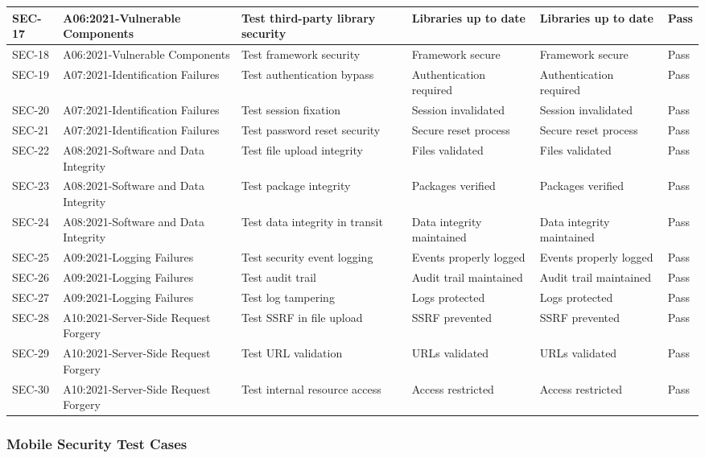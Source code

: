 {\begin{longtable}{|p{1.5cm}|p{2.5cm}|p{3.5cm}|p{2.5cm}|p{2.5cm}|p{1.5cm}|}
\hline
SEC-17 & A06:2021-Vulnerable Components & Test third-party library security & Libraries up to date & Libraries up to date & Pass \\
\hline
SEC-18 & A06:2021-Vulnerable Components & Test framework security & Framework secure & Framework secure & Pass \\
\hline
SEC-19 & A07:2021-Identification Failures & Test authentication bypass & Authentication required & Authentication required & Pass \\
\hline
SEC-20 & A07:2021-Identification Failures & Test session fixation & Session invalidated & Session invalidated & Pass \\
\hline
SEC-21 & A07:2021-Identification Failures & Test password reset security & Secure reset process & Secure reset process & Pass \\
\hline
SEC-22 & A08:2021-Software and Data Integrity & Test file upload integrity & Files validated & Files validated & Pass \\
\hline
SEC-23 & A08:2021-Software and Data Integrity & Test package integrity & Packages verified & Packages verified & Pass \\
\hline
SEC-24 & A08:2021-Software and Data Integrity & Test data integrity in transit & Data integrity maintained & Data integrity maintained & Pass \\
\hline
SEC-25 & A09:2021-Logging Failures & Test security event logging & Events properly logged & Events properly logged & Pass \\
\hline
SEC-26 & A09:2021-Logging Failures & Test audit trail & Audit trail maintained & Audit trail maintained & Pass \\
\hline
SEC-27 & A09:2021-Logging Failures & Test log tampering & Logs protected & Logs protected & Pass \\
\hline
SEC-28 & A10:2021-Server-Side Request Forgery & Test SSRF in file upload & SSRF prevented & SSRF prevented & Pass \\
\hline
SEC-29 & A10:2021-Server-Side Request Forgery & Test URL validation & URLs validated & URLs validated & Pass \\
\hline
SEC-30 & A10:2021-Server-Side Request Forgery & Test internal resource access & Access restricted & Access restricted & Pass \\
\hline
\end{longtable}
}

\subsubsection{Mobile Security Test Cases}

